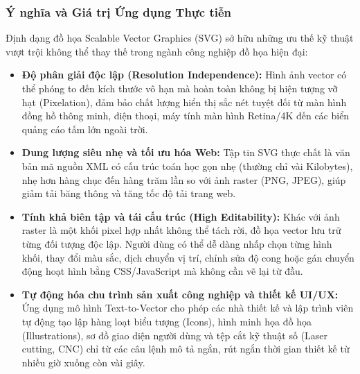 \subsubsection{Ý nghĩa và Giá trị Ứng dụng Thực tiễn}

Định dạng đồ họa Scalable Vector Graphics (SVG) sở hữu những ưu thế kỹ thuật vượt trội không thể thay thế trong ngành công nghiệp đồ họa hiện đại:
\begin{itemize}
    \item \textbf{Độ phân giải độc lập (Resolution Independence):} Hình ảnh vector có thể phóng to đến kích thước vô hạn mà hoàn toàn không bị hiện tượng vỡ hạt (Pixelation), đảm bảo chất lượng hiển thị sắc nét tuyệt đối từ màn hình đồng hồ thông minh, điện thoại, máy tính màn hình Retina/4K đến các biển quảng cáo tấm lớn ngoài trời.
    \item \textbf{Dung lượng siêu nhẹ và tối ưu hóa Web:} Tập tin SVG thực chất là văn bản mã nguồn XML có cấu trúc toán học gọn nhẹ (thường chỉ vài Kilobytes), nhẹ hơn hàng chục đến hàng trăm lần so với ảnh raster (PNG, JPEG), giúp giảm tải băng thông và tăng tốc độ tải trang web.
    \item \textbf{Tính khả biên tập và tái cấu trúc (High Editability):} Khác với ảnh raster là một khối pixel hợp nhất không thể tách rời, đồ họa vector lưu trữ từng đối tượng độc lập. Người dùng có thể dễ dàng nhấp chọn từng hình khối, thay đổi màu sắc, dịch chuyển vị trí, chỉnh sửa độ cong hoặc gán chuyển động hoạt hình bằng CSS/JavaScript mà không cần vẽ lại từ đầu.
    \item \textbf{Tự động hóa chu trình sản xuất công nghiệp và thiết kế UI/UX:} Ứng dụng mô hình Text-to-Vector cho phép các nhà thiết kế và lập trình viên tự động tạo lập hàng loạt biểu tượng (Icons), hình minh họa đồ họa (Illustrations), sơ đồ giao diện người dùng và tệp cắt kỹ thuật số (Laser cutting, CNC) chỉ từ các câu lệnh mô tả ngắn, rút ngắn thời gian thiết kế từ nhiều giờ xuống còn vài giây.
\end{itemize}
